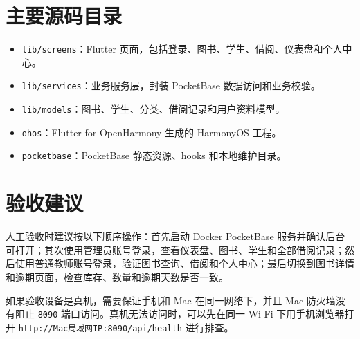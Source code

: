 \section{主要源码目录}

\begin{itemize}
    \item \texttt{lib/screens}：Flutter 页面，包括登录、图书、学生、借阅、仪表盘和个人中心。
    \item \texttt{lib/services}：业务服务层，封装 PocketBase 数据访问和业务校验。
    \item \texttt{lib/models}：图书、学生、分类、借阅记录和用户资料模型。
    \item \texttt{ohos}：Flutter for OpenHarmony 生成的 HarmonyOS 工程。
    \item \texttt{pocketbase}：PocketBase 静态资源、hooks 和本地维护目录。
\end{itemize}

\section{验收建议}

人工验收时建议按以下顺序操作：首先启动 Docker PocketBase 服务并确认后台可打开；其次使用管理员账号登录，查看仪表盘、图书、学生和全部借阅记录；然后使用普通教师账号登录，验证图书查询、借阅和个人中心；最后切换到图书详情和逾期页面，检查库存、数量和逾期天数是否一致。

如果验收设备是真机，需要保证手机和 Mac 在同一网络下，并且 Mac 防火墙没有阻止 \texttt{8090} 端口访问。真机无法访问时，可以先在同一 Wi-Fi 下用手机浏览器打开 \texttt{http://Mac局域网IP:8090/api/health} 进行排查。
